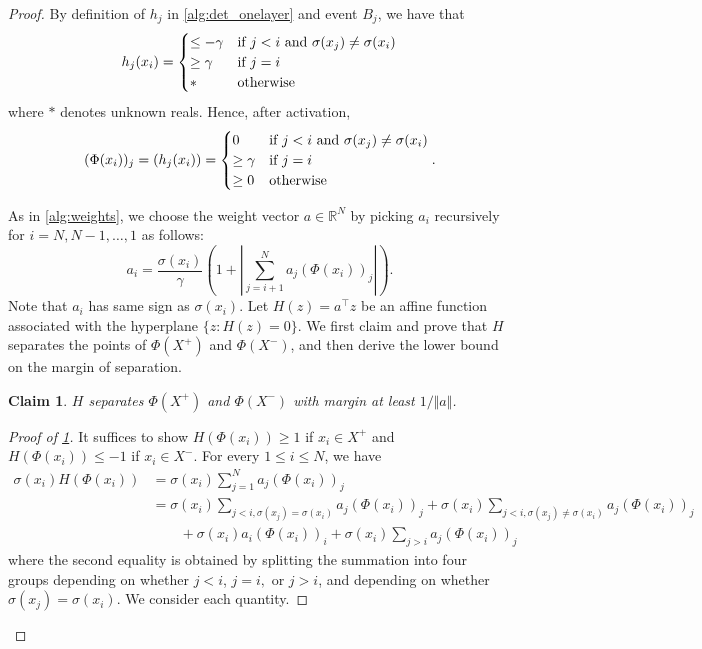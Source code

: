 \documentclass[aoap]{imsart}
\numberwithin{equation}{section}
\newtheorem{claim}[theorem]{Claim}
\theoremstyle{definition}
\theoremstyle{remark}
\newcommand{\R}{\mathbb{R}} %
\numberwithin{equation}{section}
\newcommand{\0}{\mathbf{0}}
\newcommand{\1}{\mathbf{1}}
\let \Re \relax
\DeclareMathOperator{\Re}{ReLU}
\numberwithin{equation}{section}
\begin{document}
\begin{proof}
By definition of $h_j$ in \cref{alg:det_onelayer} and event $B_j$, we have that 
\begin{equation}\label{eq:hj}
h_{j}(x_{i})=\begin{cases}
\leq -\gamma & \textup{if $j<i$ and $\sigma(x_j) \neq \sigma(x_i) $}\\
\geq \gamma  & \textup{if $j=i$}\\
* & \textup{otherwise}
\end{cases}
\end{equation}
where $*$ denotes unknown reals. Hence, after activation,
\begin{equation}\label{eq:phij}
(\Phi(x_i))_j=\Re(h_{j}(x_{i}))=\begin{cases}
0  & \textup{if $j<i$ and $\sigma(x_j) \neq \sigma(x_i) $}\\
\geq \gamma  & \textup{if $j=i$}\\
\geq 0 & \textup{otherwise}
\end{cases}.
\end{equation}

As in \cref{alg:weights}, we choose the weight vector $a\in\R^N$ by picking $a_{i}$ recursively for $i=N, N-1, \dots , 1$ as follows:
\begin{equation}\label{eq:weight_vec_choice}
    a_{i}=\frac{\sigma(x_i)}{\gamma }\left(1+\left\vert\sum_{j=i+1}^{N}a_{j}(\Phi(x_{i}))_{j}\right\vert\right).
\end{equation}
Note that $a_i$ has same sign as $\sigma(x_i)$. Let $H(z) = a^{\intercal}z$ be an affine function associated with the hyperplane $\{z : H(z) = 0\}$. We first claim and prove that $H$ separates the points of $\Phi(X^{+})$ and $\Phi(X^{-})$, and then derive the lower bound on the margin of separation.

\begin{claim}\label{claim:H sep}
$H$ separates $\Phi(X^{+})$ and $\Phi(X^{-})$ with margin at least $1/\Vert a\Vert$.
\end{claim}
\begin{proof}[Proof of \cref{claim:H sep}]
It suffices to show $H (\Phi(x_{i}))\geq 1$ if $x_{i}\in X^{+}$ and $H (\Phi(x_{i}))\leq -1$  if $x_{i}\in X^{-}$. For every $1 \le i \le N$, we have
\begin{align}\label{eq:4terms}
\sigma(x_i)  H(\Phi(x_{i})) & = \sigma(x_i) \sum_{j=1}^{N}a_{j}(\Phi(x_{i}))_{j} \nonumber
\\ & = \sigma(x_i) \sum_{j<i, \sigma(x_j) =\sigma(x_i) }a_{j}(\Phi(x_{i}))_{j} + \sigma(x_i) \sum_{j<i, \sigma(x_j) \neq \sigma(x_i) }a_{j}(\Phi(x_{i}))_{j}\nonumber
\\ & \qquad + \sigma(x_i) a_{i}(\Phi(x_{i}))_{i} + \sigma(x_i) \sum_{j>i}a_{j}(\Phi(x_{i}))_{j}
\end{align}
where the second equality is obtained by splitting the summation into four groups depending on whether $j < i$, $j = i,$ or $j > i$, and depending on whether $\sigma(x_j) = \sigma(x_i)$. We consider each quantity.


\end{proof}
\end{proof}
\end{document}
